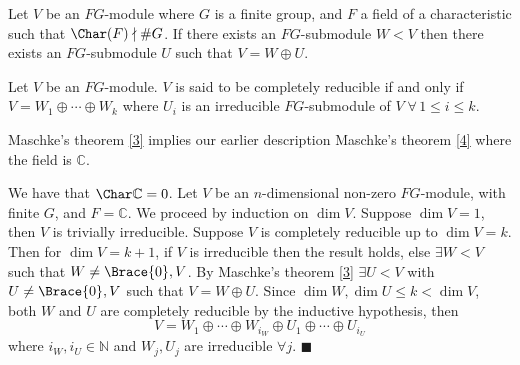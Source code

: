 \documentclass[../Project.tex]{subfiles}
\begin{document}
\begin{theo}
	Let $V$  be an $FG$-module where $G$ is a finite group, and $F$ a field of a characteristic such that $\Char(F) \nmid \#{G}$. If there exists an $FG$-submodule $W < V$ then there exists an $FG$-submodule $U$ such that $V = W \oplus U$. \label{3}
\end{theo}


\begin{defi}
	Let $V$ be an $FG$-module. $V$ is said to be completely reducible if and only if $V = W_1 \oplus \cdots \oplus W_k$ where $U_i$ is an irreducible $FG$-submodule of $V\;\forall\,1 \leqslant i \leqslant k$.
\end{defi}

\begin{prop}
	Maschke's theorem \ref{3} implies our earlier description Maschke's theorem \ref{4} where the field is $\mathbb{C}$.
\end{prop}

\begin{proo*}[\cite{2}]
	We have that $\Char\mathbb{C} = 0$. Let $V$ be an $n$-dimensional non-zero $FG$-module, with finite $G$, and $F = \mathbb{C}$. We proceed by induction on $\dim V$. Suppose $\dim V = 1$, then $V$ is trivially irreducible. Suppose $V$ is completely reducible up to $\dim V = k$. Then for $\dim V = k+1$, if $V$ is irreducible then the result holds, else $\exists W < V$ such that $W \neq \Brace{0},V$. By Maschke's theorem \ref{3} $\exists U < V$ with $U \neq \Brace{0},V$ such that $V = W \oplus U$. Since $\dim W, \dim U \leqslant k < \dim V$, both $W$ and $U$ are completely reducible by the inductive hypothesis, then
	$$V = W_1 \oplus \cdots \oplus W_{i_W} \oplus U_1 \oplus \cdots \oplus U_{i_U}$$
	where $i_W,i_U \in \mathbb{N}$ and $W_j,U_j$ are irreducible $\forall j$. $\blacksquare$
\end{proo*}
\end{document}
